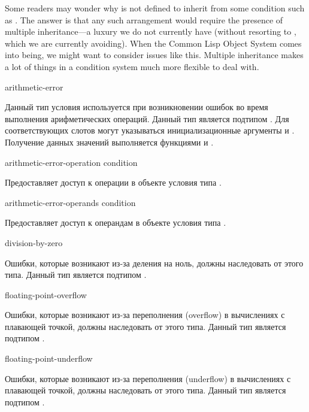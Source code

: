 \beforenoterule
\begin{sideremark} 

Some readers may wonder why  is not defined to inherit
from some condition such as . The answer is that any such
arrangement would require the presence of multiple inheritance---a  luxury we do
not currently have (without resorting to , which  we are currently
avoiding). When the Common Lisp Object System comes into being, we might want to
consider issues like this.  Multiple inheritance makes a lot of things in a
condition system much more flexible to deal with.
\end{sideremark}
\afternoterule

\begin{defun}[Тип]
arithmetic-error

Данный тип условия используется при возникновении ошибок во время выполнения
арифметических операций. Данный тип является подтипом . Для
соответствующих слотов могут указываться инициализационные аргументы
 и . Получение данных значений выполняется
функциями  и .
\end{defun}

\begin{defun}[Функция]
arithmetic-error-operation condition

Предоставляет доступ к операции в объекте условия типа .
\end{defun}

\begin{defun}[Функция]
arithmetic-error-operands condition

Предоставляет доступ к операндам в объекте условия типа .
\end{defun}

\begin{defun}[Тип]
division-by-zero

Ошибки, которые возникают из-за деления на ноль, должны наследовать от этого
типа. Данный тип является подтипом .
\end{defun}

\begin{defun}[Тип]
floating-point-overflow

Ошибки, которые возникают из-за переполнения (overflow) в вычислениях с
плавающей точкой, должны наследовать от этого типа. Данный тип является подтипом
.
\end{defun}

\begin{defun}[Тип]
floating-point-underflow

Ошибки, которые возникают из-за переполнения (underflow) в вычислениях с
плавающей точкой, должны наследовать от этого типа. Данный тип является подтипом
.
\end{defun}
\fi